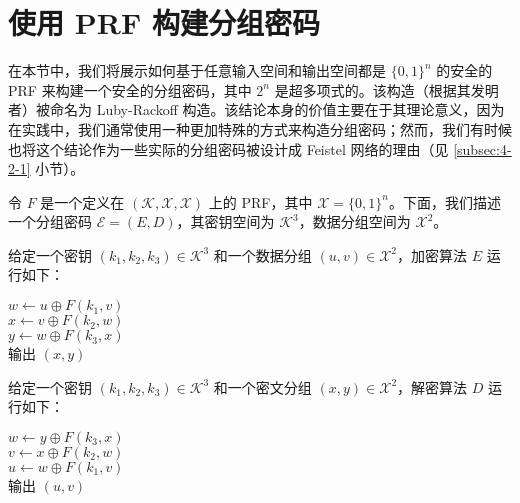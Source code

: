 \section{使用 PRF 构建分组密码}\label{sec:4-5}

在本节中，我们将展示如何基于任意输入空间和输出空间都是 $\{0,1\}^n$ 的安全的 PRF 来构建一个安全的分组密码，其中 $2^n$ 是超多项式的。该构造（根据其发明者）被命名为 Luby-Rackoff 构造。该结论本身的价值主要在于其理论意义，因为在实践中，我们通常使用一种更加特殊的方式来构造分组密码；然而，我们有时候也将这个结论作为一些实际的分组密码被设计成 Feistel 网络的理由（见 \ref{subsec:4-2-1} 小节）。

令 $F$ 是一个定义在 $(\mathcal{K},\mathcal{X},\mathcal{X})$ 上的 PRF，其中 $\mathcal{X}=\{0,1\}^n$。下面，我们描述一个分组密码 $\mathcal{E}=(E,D)$，其密钥空间为 $\mathcal{K}^3$，数据分组空间为 $\mathcal{X}^2$。

给定一个密钥 $(k_1,k_2,k_3)\in\mathcal{K}^3$ 和一个数据分组 $(u,v)\in\mathcal{X}^2$，加密算法 $E$ 运行如下：

\vspace{10pt}

\hspace*{5pt} $w\leftarrow u\oplus F(k_1,v)$\\
\hspace*{26pt} $x\leftarrow v\oplus F(k_2,w)$\\
\hspace*{26pt} $y\leftarrow w\oplus F(k_3,x)$\\
\hspace*{26pt} 输出 $(x,y)$

\vspace{10pt}

\noindent
给定一个密钥 $(k_1,k_2,k_3)\in\mathcal{K}^3$ 和一个密文分组 $(x,y)\in\mathcal{X}^2$，解密算法 $D$ 运行如下：

\vspace{10pt}

\hspace*{5pt} $w\leftarrow y\oplus F(k_3,x)$\\
\hspace*{26pt} $v\leftarrow x\oplus F(k_2,w)$\\
\hspace*{26pt} $u\leftarrow w\oplus F(k_1,v)$\\
\hspace*{26pt} 输出 $(u,v)$

\vspace{10pt}

